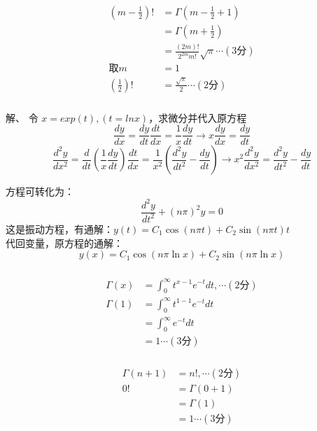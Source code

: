 \begin{frame} 
\frametitle{}
\[ \begin{aligned}
    (m-\frac{1}{2})! &= \Gamma (m-\frac{1}{2}+1) \\
                     &= \Gamma (m+\frac{1}{2}) \\
                     &= \frac{(2m)!}{2^{2m} m!}\sqrt{\pi}   \cdots  (\text{3分}) \\ 
                     \text{取}m&=1  \\ 
                     (\frac{1}{2})! &=  \frac{\sqrt{\pi}}{2}  \cdots  (\text{2分}) 
\end{aligned} \]
\end{frame}

\begin{frame} 
\frametitle{}
\alert{解、}  令 $x=exp(t) , (t=ln x)$，求微分并代入原方程\\
\begin{equation*}
    \frac{d y}{d x}  = 	\frac{d y}{d t}\frac{d t}{d x}= \frac{1}{ x}\frac{d y}{d t}  \to x \frac{d y}{d x}=	\frac{d y}{d t}
\end{equation*} 
\begin{equation*}
    \frac{d ^2y}{d x^2}  = 	\frac{d }{d t} ( \frac{1}{ x}\frac{d y}{d t}  )\frac{d t}{d x}=  
    \frac{1}{ x^2}(\frac{d ^2y}{d t^2} -	\frac{d y}{d t})   \to  	x^2 \frac{d^2 y}{d x^2} = \frac{d ^2y}{d t^2} -	\frac{d y}{d t}
\end{equation*} 

方程可转化为：
\begin{equation*}
    \frac{d^2 y}{d t^2}  +(n\pi)^2 y =0 
\end{equation*}     
这是振动方程，有通解：$	y(t)=C_1 \cos (n\pi t) +C_2 \sin (n\pi t) t$ \\
代回变量，原方程的通解：
\begin{equation*}
    y(x)=C_1 \cos (n\pi \ln x) +C_2 \sin (n\pi\ln x)
\end{equation*}    
\end{frame}

\begin{frame} 
\frametitle{}
\[ \begin{aligned}
    \Gamma(x)&=\int_{0}^{\infty} t^{x-1} e^{-t} dt,   \cdots  (\text{2分})  \\
	\Gamma(1)&=\int_{0}^{\infty} t^{1-1} e^{-t} dt \\	
			&=\int_{0}^{\infty}  e^{-t} dt \\ 
            &=1	 \cdots  (\text{3分}) 
\end{aligned}\]
\end{frame}

\begin{frame} 
\frametitle{}
\[ \begin{aligned}
    \Gamma(n+1)&=n!,   \cdots  (\text{2分})  \\
	0!& =\Gamma(0+1)\\	
			&=\Gamma(1) \\ 
            &=1	 \cdots  (\text{3分}) 
\end{aligned}\]
\end{frame}